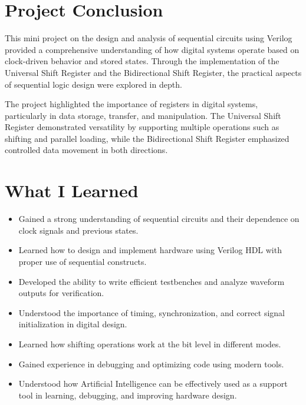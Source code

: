 \documentclass[12pt]{article}
\begin{document}
\section*{Project Conclusion}

This mini project on the design and analysis of sequential circuits using Verilog provided a comprehensive understanding of how digital systems operate based on clock-driven behavior and stored states. Through the implementation of the Universal Shift Register and the Bidirectional Shift Register, the practical aspects of sequential logic design were explored in depth.

The project highlighted the importance of registers in digital systems, particularly in data storage, transfer, and manipulation. The Universal Shift Register demonstrated versatility by supporting multiple operations such as shifting and parallel loading, while the Bidirectional Shift Register emphasized controlled data movement in both directions.

\section*{What I Learned}

\begin{itemize}
    \item Gained a strong understanding of sequential circuits and their dependence on clock signals and previous states.
    
    \item Learned how to design and implement hardware using Verilog HDL with proper use of sequential constructs.
    
    \item Developed the ability to write efficient testbenches and analyze waveform outputs for verification.
    
    \item Understood the importance of timing, synchronization, and correct signal initialization in digital design.
    
    \item Learned how shifting operations work at the bit level in different modes.
    
    \item Gained experience in debugging and optimizing code using modern tools.
    
    \item Understood how Artificial Intelligence can be effectively used as a support tool in learning, debugging, and improving hardware design.
\end{itemize}
\end{document}
